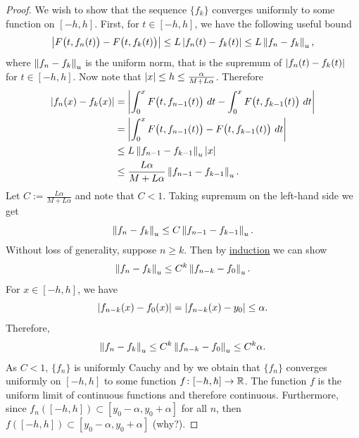 \begin{proof}
We wish to show that the sequence $\{ f_k \}$ converges uniformly
to some function on $[-h,h]$.  First, for $t \in [-h,h]$,
we have the following
useful bound
\begin{equation*}
\left\lvert {F\bigl(t,f_{n}(t)\bigr) - 
F\bigl(t,f_{k}(t)\bigr)} \right\rvert
\leq
L \left\lvert {f_n(t)-f_k(t)} \right\rvert
\leq
L \left\lVert {f_n-f_k} \right\rVert_u ,
\end{equation*}
where $\left\lVert {f_n-f_k} \right\rVert_u$ is the uniform norm, that
is the supremum of $\left\lvert {f_n(t)-f_k(t)} \right\rvert$ for $t \in [-h,h]$.
Now note that $\left\lvert {x} \right\rvert \leq h \leq \frac{\alpha}{M+L\alpha}$.
Therefore
\begin{equation*}
\begin{split}
\left\lvert {f_n(x) - f_k(x)} \right\rvert
& =
\left\lvert {\int_{0}^x F\bigl(t,f_{n-1}(t)\bigr)~dt 
-
\int_{0}^x F\bigl(t,f_{k-1}(t)\bigr)~dt} \right\rvert
\\
& =
\left\lvert {\int_{0}^x F\bigl(t,f_{n-1}(t)\bigr)-
F\bigl(t,f_{k-1}(t)\bigr)~dt} \right\rvert
\\
& \leq
L\left\lVert {f_{n-1}-f_{k-1}} \right\rVert_u
\left\lvert {x} \right\rvert
\\
& \leq
\frac{L\alpha}{M+L\alpha}
\left\lVert {f_{n-1}-f_{k-1}} \right\rVert_u .
\end{split}
\end{equation*}
Let $C := \frac{L\alpha}{M+L\alpha}$ and note that $C < 1$.
Taking supremum on the left-hand side we get
\begin{equation*}
\left\lVert {f_n-f_k} \right\rVert_u \leq C \left\lVert {f_{n-1}-f_{k-1}} \right\rVert_u .
\end{equation*}
Without loss of generality,
suppose $n \geq k$.  Then by \hyperref[induction:thm]{induction} we can show 
\begin{equation*}
\left\lVert {f_n-f_k} \right\rVert_u \leq C^{k} \left\lVert {f_{n-k}-f_{0}} \right\rVert_u .
\end{equation*}
For $x \in [-h,h]$, we have
\begin{equation*}
\left\lvert {f_{n-k}(x)-f_{0}(x)} \right\rvert
=
\left\lvert {f_{n-k}(x)-y_0} \right\rvert
\leq \alpha .
\end{equation*}
Therefore,
\begin{equation*}
\left\lVert {f_n-f_k} \right\rVert_u \leq C^{k} \left\lVert {f_{n-k}-f_{0}} \right\rVert_u \leq C^{k} \alpha .
\end{equation*}
As $C < 1$, $\{f_n\}$ is uniformly Cauchy and by
 we obtain that $\{ f_n \}$
converges uniformly on $[-h,h]$ to some function $f \colon [-h,h] \to {\mathbb{R}}$.
The function $f$ is the uniform limit of continuous functions and therefore
continuous.  Furthermore, since $f_n([-h,h]) \subset
[y_0-\alpha,y_0+\alpha]$ for all $n$, then $f([-h,h]) \subset [y_0-\alpha,y_0+\alpha]$
(why?).



\end{proof}
